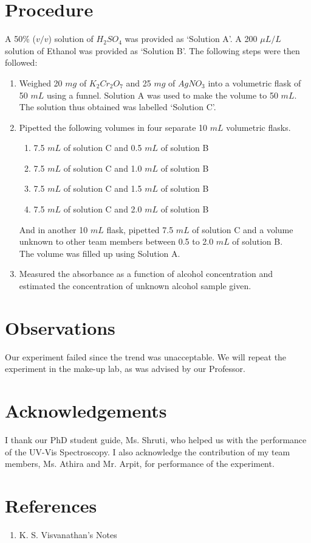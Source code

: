 \section{Procedure}
	A 50\% ($v/v$) solution of $H_{2}SO_{4}$ was provided as `Solution A'. A 200 $\mu L/L$ solution of Ethanol was provided as `Solution B'. The following steps were then followed:
	\begin{enumerate}
		\item Weighed 20 $mg$ of $K_{2}Cr_{2}O_{7}$ and 25 $mg$ of $AgNO_{3}$ into a volumetric flask of 50 $mL$ using a funnel. Solution A was used to make the volume to 50 $mL$. The solution thus obtained was labelled `Solution C'.
		\item Pipetted the following volumes in four separate 10 $mL$ volumetric flasks.
			\begin{enumerate}
				\item 7.5 $mL$ of solution C and 0.5 $mL$ of solution B
				\item 7.5 $mL$ of solution C and 1.0 $mL$ of solution B
				\item 7.5 $mL$ of solution C and 1.5 $mL$ of solution B
				\item 7.5 $mL$ of solution C and 2.0 $mL$ of solution B
			\end{enumerate}		
		And in another 10 $mL$ flask, pipetted 7.5 $mL$ of solution C and a volume unknown to other team members between 0.5 to 2.0 $mL$ of solution B.\\
		The volume was filled up using Solution A.
		\item Measured the absorbance as a function of alcohol concentration and estimated the concentration of unknown alcohol sample given.
	\end{enumerate}


\section{Observations}
Our experiment failed since the trend was unacceptable. We will repeat the experiment in the make-up lab, as was advised by our Professor.

\section{Acknowledgements}
I thank our PhD student guide, Ms. Shruti, who helped us with the performance of the UV-Vis Spectroscopy. I also acknowledge the contribution of my team members, Ms. Athira and Mr. Arpit, for performance of the experiment.

\section{References}
\begin{enumerate}
	\item K. S. Visvanathan's Notes
\end{enumerate}